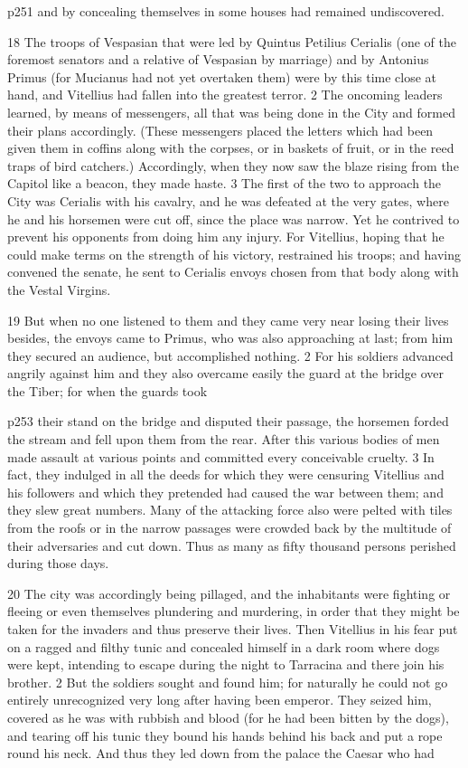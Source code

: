 p251 and by concealing themselves in some houses had remained undiscovered.

18
The troops of Vespasian that were led by Quintus Petilius Cerialis (one of the foremost senators and a relative of Vespasian by marriage) and by Antonius Primus (for Mucianus had not yet overtaken them) were by this time close at hand, and Vitellius had fallen into the greatest terror. 2 The oncoming leaders learned, by means of messengers, all that was being done in the City and formed their plans accordingly. (These messengers placed the letters which had been given them in coffins along with the corpses, or in baskets of fruit, or in the reed traps of bird catchers.) Accordingly, when they now saw the blaze rising from the Capitol like a beacon, they made haste. 3 The first of the two to approach the City was Cerialis with his cavalry, and he was defeated at the very gates, where he and his horsemen were cut off, since the place was narrow. Yet he contrived to prevent his opponents from doing him any injury. For Vitellius, hoping that he could make terms on the strength of his victory, restrained his troops; and having convened the senate, he sent to Cerialis envoys chosen from that body along with the Vestal Virgins.

19
But when no one listened to them and they came very near losing their lives besides, the envoys came to Primus, who was also approaching at last; from him they secured an audience, but accomplished nothing. 2 For his soldiers advanced angrily against him and they also overcame easily the guard at the bridge over the Tiber; for when the guards took

p253 their stand on the bridge and disputed their passage, the horsemen forded the stream and fell upon them from the rear. After this various bodies of men made assault at various points and committed every conceivable cruelty. 3 In fact, they indulged in all the deeds for which they were censuring Vitellius and his followers and which they pretended had caused the war between them; and they slew great numbers. Many of the attacking force also were pelted with tiles from the roofs or in the narrow passages were crowded back by the multitude of their adversaries and cut down. Thus as many as fifty thousand persons perished during those days.

20
The city was accordingly being pillaged, and the inhabitants were fighting or fleeing or even themselves plundering and murdering, in order that they might be taken for the invaders and thus preserve their lives. Then Vitellius in his fear put on a ragged and filthy tunic and concealed himself in a dark room where dogs were kept, intending to escape during the night to Tarracina and there join his brother. 2 But the soldiers sought and found him; for naturally he could not go entirely unrecognized very long after having been emperor. They seized him, covered as he was with rubbish and blood (for he had been bitten by the dogs), and tearing off his tunic they bound his hands behind his back and put a rope round his neck. And thus they led down from the palace the Caesar who had

